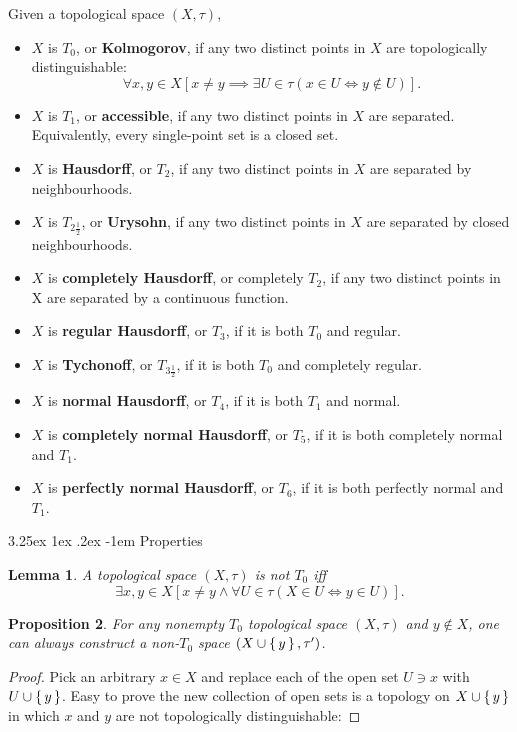 \documentclass[12pt, letterpaper]{article}
\makeatletter
\renewcommand\subparagraph{\@startsection{subparagraph}{5}{\parindent}%
	{3.25ex \@plus1ex \@minus .2ex}%
	{0.75ex plus 0.1ex}%
	{\normalfont\normalsize\bfseries}}
\newtheorem{prop}{Proposition}[section]
\newtheorem{lem}[prop]{Lemma}
\renewcommand\subparagraph{\@startsection{subparagraph}{5}{\parindent}%
	{3.25ex \@plus1ex \@minus .2ex}%
	{-1em}%
	{\normalfont\normalsize\bfseries}}
\theoremstyle{definition}
\theoremstyle{remark}
\theoremstyle{definition}
\theoremstyle{plain}
\numberwithin{equation}{section}
\makeatother
\begin{document}
	\begin{def*}
		Given a topological space $(X,\tau)$,
		\begin{itemize}
			\item $X$ is $T_0$, or \textbf{Kolmogorov}, if any two distinct points in $X$ are topologically distinguishable:
			\[\forall x,y\in X [x\ne y \implies\exists U\in\tau (x\in U\iff y\notin U)] .\]
			\item $X$ is $T_1$, or \textbf{accessible}, if any two distinct points in $X$ are separated. Equivalently, every single-point set is a closed set.
			\item $X$ is \textbf{Hausdorff}, or $T_2$, if any two distinct points in $X$ are separated by neighbourhoods.
			\item $X$ is $T_{2\frac{1}{2}}$, or \textbf{Urysohn}, if any two distinct points in $X$ are separated by closed neighbourhoods.
			\item $X$ is \textbf{completely Hausdorff}, or completely $T_2$, if any two distinct points in X are separated by a continuous function.
			\item $X$ is \textbf{regular Hausdorff}, or $T_3$, if it is both $T_0$ and regular.
			\item $X$ is \textbf{Tychonoff}, or $T_{3\frac{1}{2}}$, if it is both $T_0$ and completely regular.
			\item $X$ is \textbf{normal Hausdorff}, or $T_4$, if it is both $T_1$ and normal.
			
			\item $X$ is \textbf{completely normal Hausdorff}, or $T_5$, if it is both completely normal and $T_1$.

			\item $X$ is \textbf{perfectly normal Hausdorff}, or $T_6$, if it is both perfectly normal and $T_1$.
		\end{itemize}
	\end{def*}
	\subparagraph{Properties}
	\begin{lem}
		A topological space $(X,\tau)$ is not $T_0$ iff
		\[\exists x,y\in X[x\ne y\land \forall U\in \tau (X\in U\iff y\in U)] .\]
	\end{lem}
	\begin{prop}
		For any nonempty $T_0$ topological space $(X,\tau)$ and $y\notin X$,
		one can always construct a non-$T_0$ space $(X\cup\set{y},\tau')$.
	\end{prop}
	\begin{proof}
		Pick an arbitrary $x\in X$ and replace each of the open set $U\ni x$ with
		$U\cup\set{y}$. Easy to prove the new collection of open sets is a topology on $X\cup\set{y}$
		in which $x$ and $y$ are not topologically distinguishable:
	\end{proof}
	
\end{document}
